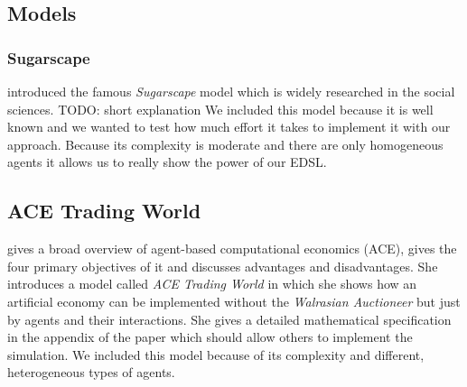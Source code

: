 \subsection{Models}
 
\subsubsection{Sugarscape}
\cite{epstein_growing_1996} introduced the famous \textit{Sugarscape} model which is widely researched in the social sciences. TODO: short explanation
We included this model because it is well known and we wanted to test how much effort it takes to implement it with our approach. Because its complexity is moderate and there are only homogeneous agents it allows us to really show the power of our EDSL.

\subsection{ACE Trading World}
\cite{tesfatsion_agent-based_2006} gives a broad overview of agent-based computational economics (ACE), gives the four primary objectives of it and discusses advantages and disadvantages. She introduces a model called \textit{ACE Trading World} in which she shows how an artificial economy can be implemented without the \textit{Walrasian Auctioneer} but just by agents and their interactions. She gives a detailed mathematical specification in the appendix of the paper which should allow others to implement the simulation. We included this model because of its complexity and different, heterogeneous types of agents.